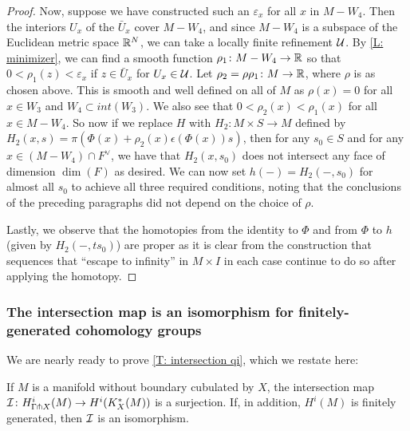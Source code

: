 \begin{proof}
	Now, suppose we have constructed such an $\varepsilon_x$ for all $x$ in $M - W_4$.
	Then the interiors $U_x$ of the $\bar U_x$ cover $M - W_4$, and since $M - W_4$ is a subspace of the Euclidean metric space $\mathbb{R}^N$, we can take a locally finite refinement $\mathcal{U}$.
	By \cref{L: minimizer}, we can find a smooth function $\rho_1 \colon M - W_4 \to \mathbb{R}$ so that $0<\rho_1(z)<\varepsilon_x$ if $z \in \bar U_x$ for $U_x \in \mathcal{U}$.
	Let $\rho_2 = \rho\rho_1 \colon M \to \mathbb{R}$, where $\rho$ is as chosen above.
	This is smooth and well defined on all of $M$ as $\rho(x) = 0$ for all $x \in W_3$ and $W_4 \subset int(W_3)$.
	We also see that $0<\rho_2(x)<\rho_1(x)$ for all $x \in M - W_4$.
	So now if we replace $H$ with $H_2 \colon M \times S \to M$ defined by $H_2(x,s) = \pi(\Phi(x)+\rho_2(x)\epsilon(\Phi(x)) s)$, then for any $s_0 \in S$ and for any $x \in (M - W_4) \cap F^\vee$, we have that $H_2(x,s_0)$ does not intersect any face of dimension $\dim(F)$ as desired.
	We can now set $h(-) = H_2(-,s_0)$ for almost all $s_0$ to achieve all three required conditions, noting that the conclusions of the preceding paragraphs did not depend on the choice of $\rho$.


	Lastly, we observe that the homotopies from the identity to $\Phi$ and from $\Phi$ to $h$ (given by $H_2(-,ts_0)$) are proper as it is clear from the construction that sequences that ``escape to infinity'' in $M \times I$ in each case continue to do so after applying the homotopy.
\end{proof}

\subsubsection{The intersection map is an isomorphism for finitely-generated cohomology groups}

We are nearly ready to prove \cref{T: intersection qi}, which we restate here:



\begin{theorem*}
	If $M$ is a manifold without boundary cubulated by $X$, the intersection map $\mathcal{I} \colon H^i_{\Gamma \pitchfork X}(M) \to H^i(K_X^*(M))$ is a surjection.
	If, in addition, $H^i(M)$ is finitely generated, then $\mathcal{I}$ is an isomorphism.
\end{theorem*}

